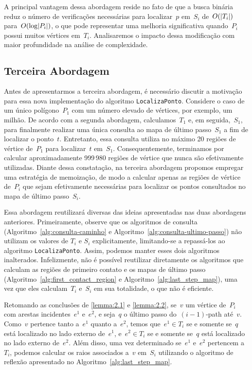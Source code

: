 \documentclass[11pt]{article}
\newcommand{\algref}[1]{\ref{#1}}
\DeclarePairedDelimiter{\abs}{\lvert}{\rvert}
\begin{document}
A principal vantagem dessa abordagem reside no fato de que a busca binária reduz o número de verificações necessárias para localizar~\(p\) em~\(S_i\) de~\(O(\abs{T_i})\) para~\(O(\log\abs{P_i})\), o que pode representar uma melhoria significativa quando~\(P_i\) possui muitos vértices em~\(T_i\). Analisaremos o impacto dessa modificação com maior profundidade na análise de complexidade.

\subsection{Terceira Abordagem}

Antes de apresentarmos a terceira abordagem, é necessário discutir a motivação para essa nova implementação do algoritmo \texttt{LocalizaPonto}. Considere o caso de um único polígono~\(P_1\) com um número elevado de vértices, por exemplo, um milhão. De acordo com a segunda abordagem, calculamos~\(T_1\) e, em seguida,~\(S_1\), para finalmente realizar uma única consulta ao mapa de último passo~\(S_1\) a fim de localizar o ponto~\(t\). Entretanto, essa consulta utiliza no máximo 20 regiões de vértice de~\(P_1\) para localizar~\(t\) em~\(S_1\). Consequentemente, terminamos por calcular aproximadamente 999\,980 regiões de vértice que nunca são efetivamente utilizadas. Diante dessa constatação, na terceira abordagem propomos empregar uma estratégia de memoização, de modo a calcular apenas as regiões de vértice de~\(P_i\) que sejam efetivamente necessárias para localizar os pontos consultados no mapa de último passo~\(S_i\).

Essa abordagem reutilizará diversas das ideias apresentadas nas duas abordagens anteriores. Primeiramente, observe que os algoritmos de consulta (Algoritmo~\algref{alg:consulta-caminho} e Algoritmo~\algref{alg:consulta-ultimo-passo}) não utilizam os valores de \(T_i\) e \(S_i\) explicitamente, limitando-se a repassá-los ao algoritmo \texttt{LocalizaPonto}. Assim, podemos manter esses dois algoritmos inalterados. Infelizmente, não é possível reutilizar diretamente os algoritmos que calculam as regiões de primeiro contato e os mapas de último passo (Algoritmo~\algref{alg:first_contact_region} e Algoritmo~\algref{alg:last_step_map}), uma vez que eles calculam~\(T_i\) e~\(S_i\) em sua totalidade, o que não é eficiente.

Retomando as conclusões de \ref{lemma:2.1} e \ref{lemma:2.2}, se~\(v\) um vértice de~\(P_i\) com arestas incidentes~\(e^1\) e~\(e^2\), e seja~\(q\) o último passo do~\((i - 1)\)-path até~\(v\). Como~\(v\) pertence tanto a~\(e^1\) quanto a~\(e^2\), temos que~\(e^1 \in T_i\) se e somente se~\(q\) está localizado no lado externo de~\(e^1\), e~\(e^2 \in T_i\) se e somente se~\(q\) está localizado no lado externo de~\(e^2\). Além disso, uma vez determinado se~\(e^1\) e~\(e^2\) pertencem a~\(T_i\), podemos calcular os raios associados a~\(v\) em~\(S_i\) utilizando o algoritmo de reflexão apresentado no Algoritmo~\algref{alg:last_step_map}.
\end{document}
